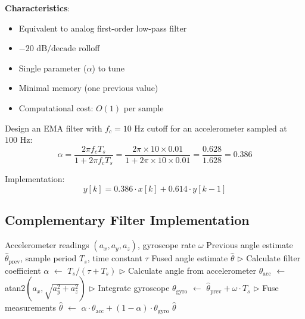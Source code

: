 \textbf{Characteristics}:
\begin{itemize}
    \item Equivalent to analog first-order low-pass filter
    \item $-20\text{ dB/decade}$ rolloff
    \item Single parameter ($\alpha$) to tune
    \item Minimal memory (one previous value)
    \item Computational cost: $O(1)$ per sample
\end{itemize}

\begin{example}
\label{ex:ema_accel}

Design an EMA filter with $f_c = 10\text{ Hz}$ cutoff for an accelerometer sampled at $100\text{ Hz}$:
\begin{equation}
\alpha = \frac{2\pi f_c T_s}{1 + 2\pi f_c T_s} = \frac{2\pi \times 10 \times 0.01}{1 + 2\pi \times 10 \times 0.01} = \frac{0.628}{1.628} = 0.386
\end{equation}

Implementation:
\begin{equation}
y[k] = 0.386 \cdot x[k] + 0.614 \cdot y[k-1]
\end{equation}
\end{example}

\subsection{Complementary Filter Implementation}

\begin{algorithm}[htbp]
\caption{Complementary Filter for Tilt Estimation}
\label{alg:complementary}
\begin{algorithmic}
\REQUIRE Accelerometer readings $(a_x, a_y, a_z)$, gyroscope rate $\omega$
\REQUIRE Previous angle estimate $\hat{\theta}_{\text{prev}}$, sample period $T_s$, time constant $\tau$
\ENSURE Fused angle estimate $\hat{\theta}$
\STATE $\triangleright$ Calculate filter coefficient
\STATE $\alpha$ $\leftarrow$ $T_s / (\tau + T_s)$
\STATE $\triangleright$ Calculate angle from accelerometer
\STATE $\theta_{\text{acc}}$ $\leftarrow$ atan2$(a_x, \sqrt{a_y^2 + a_z^2})$ 
\STATE $\triangleright$ Integrate gyroscope
\STATE $\theta_{\text{gyro}}$ $\leftarrow$ $\hat{\theta}_{\text{prev}} + \omega \cdot T_s$
\STATE $\triangleright$ Fuse measurements
\STATE $\hat{\theta}$ $\leftarrow$ $\alpha \cdot \theta_{\text{acc}} + (1 - \alpha) \cdot \theta_{\text{gyro}}$
\RETURN $\hat{\theta}$
\end{algorithmic}
\end{algorithm}

